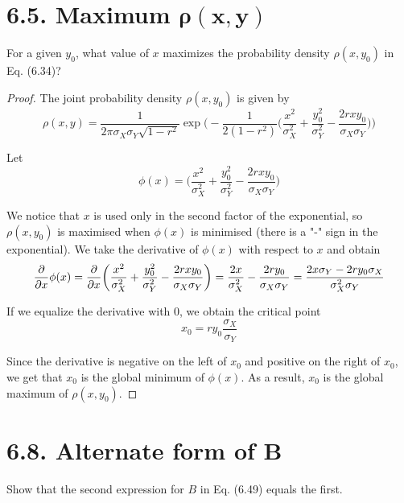\section*{6.5. Maximum $\bm{\rho(x, y)}$}
For a given $y_0$, what value of $x$ maximizes the probability density
$\rho(x, y_0)$ in Eq. (6.34)?

\vspace{1em}

\begin{proof}
    The joint probability density $\rho(x, y_0)$ is given by
    \begin{equation*}\tag{6.34}
        \rho(x, y) = \frac{1}{2\pi\sigma_X\sigma_Y\sqrt{1 - r^2}} 
        \exp\bigg(-\frac{1}{2(1 - r^2)}\bigg(\frac{x^2}{\sigma_X^2} 
            + \frac{y_0^2}{\sigma_Y^2} - \frac{2rxy_0}{\sigma_X\sigma_Y}\bigg)\bigg)
    \end{equation*}

    Let
    \[
        \phi(x) 
        = \bigg(\frac{x^2}{\sigma_X^2} + \frac{y_0^2}{\sigma_Y^2} - \frac{2rxy_0}{\sigma_X\sigma_Y}\bigg) 
    \] 

    We notice that $x$ is used only in the second factor of the exponential, so
    $\rho(x, y_0)$ is maximised when $\phi(x)$ is minimised (there is a "-" sign in the exponential). We take the derivative of $\phi(x)$
    with respect to $x$ and  obtain
    \[
        \pdv{x} \phi(x) 
        = \pdv{x} \bigg(\frac{x^2}{\sigma_X^2} + \frac{y_0^2}{\sigma_Y^2} - \frac{2rxy_0}{\sigma_X\sigma_Y}\bigg) 
        = \frac{2x}{\sigma_X^2} - \frac{2ry_0}{\sigma_X\sigma_Y}
        = \frac{2x\sigma_Y - 2ry_0\sigma_X}{\sigma_X^2\sigma_Y}
    \] 

    If we equalize the derivative with 0, we obtain the critical point
    \[
        x_0 = ry_0 \frac{\sigma_X}{\sigma_Y}
    \] 

    Since the derivative is negative on the left of $x_0$ and positive on the right of $x_0$,
    we get that $x_0$ is the global minimum of $\phi(x)$. As a result, $x_0$ is the global maximum
    of $\rho(x, y_0)$.
\end{proof}

\section*{6.8. Alternate form of B}
Show that the second expression for $B$ in Eq. (6.49) equals
the first.


